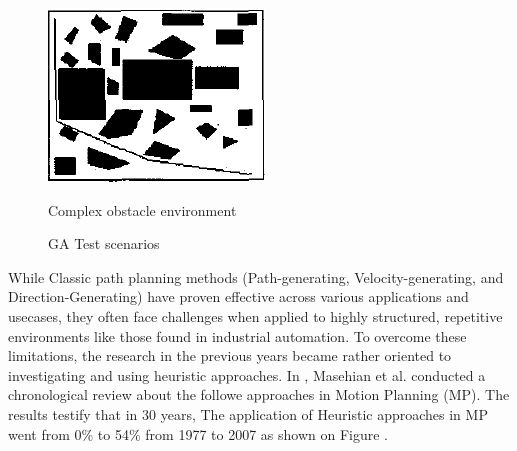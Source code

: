 \begin{figure}[h!]
\begin{minipage}{0.30\textwidth}
        \label{Intermediate obstacle environment}
    \end{minipage}
    \begin{minipage}{0.30\textwidth}
        \centering
        \includegraphics[width=\linewidth]{images/Chap1/R17_complex.png} %
        \caption{Complex obstacle environment}
        \label{Complex obstacle environment}
    \end{minipage}
    \caption{GA Test scenarios \cite{R17}}
    \label{R17 test scenarios}
\end{figure}

While Classic path planning methods (Path-generating, Velocity-generating, and Direction-Generating) 
have proven effective across various applications and usecases, 
they often face challenges when applied to highly structured, repetitive environments like those found 
in industrial automation. To overcome these limitations, the research in the previous years became rather 
oriented to investigating and using heuristic approaches. In \cite{R26}, Masehian et al. conducted a 
chronological review about the followe approaches in Motion Planning (MP). The results testify that in 30 years,
The application of Heuristic approaches in MP went from 0\% to 54\% from 1977 to 2007 as shown on Figure 
.

